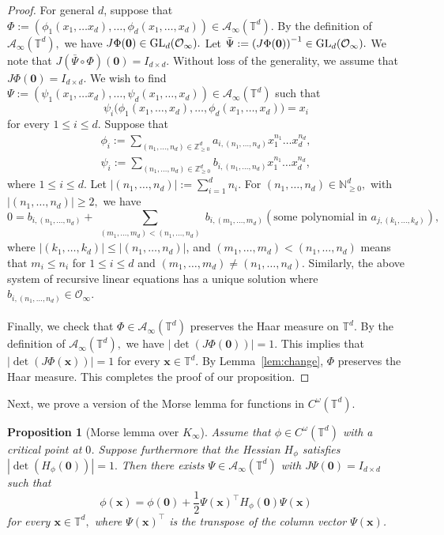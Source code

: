 \documentclass[10pt]{amsart}
\theoremstyle{plain}
\theoremstyle{plain}
\newtheorem{proposition}[theorem]{Proposition}
\renewcommand{\vec}[1]{\mathbf{#1}}
\theoremstyle{remark}
\theoremstyle{definition}
\newcommand{\Ki}{K_\infty}
\newcommand{\GL}{\textup{GL}}
\newcommand{\NNz}{\mathbb{N}_{\geq 0}}
\newcommand{\TT}{\mathbb{T}}
\newcommand{\cA}{\mathcal{A}}
\newcommand{\cO}{\mathcal{O}}
\begin{document}
\begin{proof}
For general $d$, suppose that \( \Phi:=(\phi_1(x_1,\dots x_d),\dots,\phi_d(x_1,\dots,x_d)) \in \cA_{\infty}(\TT^d) \).  By the definition of $\cA_{\infty}(\TT^d),$ we have $ J\Phi(\vec{0}) \in \GL_d(\cO_{\infty}).$ Let $\bar{\Psi}:=\left(J\Phi(\vec{0})\right)^{-1}\in \GL_d(\cO_{\infty}). $  We note that 
$J(\bar{\Psi} \circ \Phi)(\vec{0})= I_{d\times d}.$ Without loss of the generality, we assume that $J\Phi(\vec{0})= I_{d\times d}.$
We wish to find  \( \Psi:=(\psi_1(x_1,\dots x_d),\dots,\psi_d(x_1,\dots,x_d))\in \cA_{\infty}(\TT^d)  \) such that 
\[\psi_i\big(\phi_1(x_1,\dots,x_d), \dots,\phi_d(x_1,\dots,x_d) \big)= x_i\]
for every $1\leq i\leq d.$ Suppose that 
\begin{equation*}
\begin{split}
 \phi_i:=\sum_{(n_1,\dots,n_d)\in \mathbb{Z}_{\geq 0}^d}a_{i,(n_1,\dots,n_d)} x_1^{n_1}\dots x_d^{n_d},
\\
 \psi_i:=\sum_{(n_1,\dots,n_d)\in\mathbb{Z}_{\geq 0}^d}b_{i,(n_1,\dots,n_d)} x_1^{n_1}\dots x_d^{n_d},
 \end{split}
 \end{equation*}
 where $1\leq i\leq d.$ Let $|(n_1,\dots,n_d)|:= \sum_{i=1}^dn_i.$ For  $(n_1,\dots,n_d)\in \NNz^d,$ with $|(n_1,\dots,n_d)| \geq 2,$ we have 
 \begin{equation}
0= b_{i,(n_1,\dots,n_d)}+ \sum_{\substack{{(m_1,\dots,m_d)< (n_1,\dots,n_d)}}}   b_{i,(m_1,\dots,m_d)} (\text{some polynomial in $a_{j,(k_1,\dots,k_d)}$}),
 \end{equation}
 where $|(k_1,\dots,k_d)|\leq |(n_1,\dots,n_d)|$, and $(m_1,\dots,m_d)< (n_1,\dots,n_d)$ means that $m_i\leq n_i$ for $1\leq i\leq d$ and $(m_1,\dots,m_d)\neq (n_1,\dots,n_d).$ Similarly, the above system of recursive linear equations has a unique solution where $b_{i,(n_1,\dots,n_d)} \in \cO_{\infty}.$\\
\\
Finally, we check that $\Phi \in \cA_{\infty}(\TT^d)$  preserves the Haar measure on $\TT^d.$ By the definition of $\cA_{\infty}(\TT^d),$ we have $ |\det (J\Phi(\vec{0}))|=1.$ This implies that $|\det (J\Phi(\vec{x}))|=1$ for every $\vec{x}\in \TT^d.$  By Lemma~\ref{lem:change}, $\Phi$ preserves the Haar measure. This completes the proof of our proposition. 
\end{proof}
Next, we prove a version of the Morse lemma for functions in $C^{\omega}(\TT^d).$
\begin{proposition}[Morse lemma over $\Ki$]\label{prop:morse} Assume that $\phi\in C^{\omega}(\TT^d)$ with a  critical point at $0$. Suppose furthermore that the Hessian $H_{\phi}$ satisfies $|\det(H_{\phi}(\vec{0}))|=1.$  Then there exists $\Psi\in \cA_{\infty}(\TT^d)$ with $J\Psi(\vec{0})=I_{d\times d}$ such that  
\[
\phi(\vec{x})=\phi(\vec{0})+\frac{1}{2}\Psi(\vec{x})^{\intercal}H_{\phi}(\vec{0})\Psi(\vec{x})
\]
for every $\vec{x}\in \TT^d,$ where $\Psi(\vec{x})^{\intercal}$ is the transpose of the column vector $\Psi(\vec{x})$.
\end{proposition}
\end{document}
